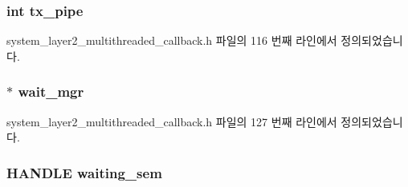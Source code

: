 \subsubsection[{\texorpdfstring{tx\+\_\+pipe}{tx_pipe}}]{\setlength{\rightskip}{0pt plus 5cm}int tx\+\_\+pipe\hspace{0.3cm}{\ttfamily [private]}}\hypertarget{classavdecc__lib_1_1system__layer2__multithreaded__callback_a3709435136aa29f099b91ff297640b5b}{}\label{classavdecc__lib_1_1system__layer2__multithreaded__callback_a3709435136aa29f099b91ff297640b5b}


system\+\_\+layer2\+\_\+multithreaded\+\_\+callback.\+h 파일의 116 번째 라인에서 정의되었습니다.

\subsubsection[{\texorpdfstring{wait\+\_\+mgr}{wait_mgr}}]{ $\ast$ wait\+\_\+mgr\hspace{0.3cm}{\ttfamily [private]}}\hypertarget{classavdecc__lib_1_1system__layer2__multithreaded__callback_af8628baeb5f5db798721c4af01e8b253}{}\label{classavdecc__lib_1_1system__layer2__multithreaded__callback_af8628baeb5f5db798721c4af01e8b253}


system\+\_\+layer2\+\_\+multithreaded\+\_\+callback.\+h 파일의 127 번째 라인에서 정의되었습니다.

\subsubsection[{\texorpdfstring{waiting\+\_\+sem}{waiting_sem}}]{\setlength{\rightskip}{0pt plus 5cm}H\+A\+N\+D\+LE waiting\+\_\+sem\hspace{0.3cm}{\ttfamily [private]}}\hypertarget{classavdecc__lib_1_1system__layer2__multithreaded__callback_adce35e578bf2dd061b0df92b9ac7bb52}{}\label{classavdecc__lib_1_1system__layer2__multithreaded__callback_adce35e578bf2dd061b0df92b9ac7bb52}


